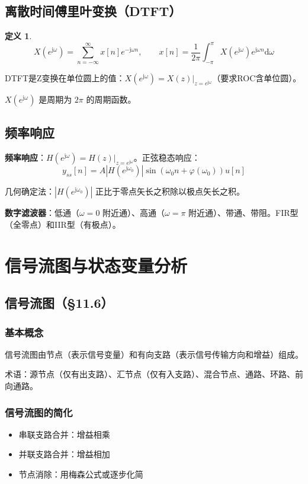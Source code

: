 \documentclass[11pt,a4paper]{ctexart}
\newtheorem{definition}{定义}[section]
\newcommand{\jj}{\mathrm{j}}            %
\newcommand{\dd}{\mathrm{d}}            %
\begin{document}
\subsection{离散时间傅里叶变换（DTFT）}

\begin{definition}
\[
X(e^{\jj\omega}) = \sum_{n=-\infty}^{\infty} x[n]e^{-\jj\omega n},\qquad
x[n] = \frac{1}{2\pi}\int_{-\pi}^{\pi} X(e^{\jj\omega})e^{\jj\omega n}\dd\omega
\]
\end{definition}

DTFT是Z变换在单位圆上的值：$X(e^{\jj\omega}) = X(z)|_{z=e^{\jj\omega}}$（要求ROC含单位圆）。

$X(e^{\jj\omega})$ 是周期为 $2\pi$ 的周期函数。

\subsection{频率响应}

\textbf{频率响应}：$H(e^{\jj\omega}) = H(z)|_{z=e^{\jj\omega}}$。正弦稳态响应：
\[
y_{ss}[n] = A|H(e^{\jj\omega_0})|\sin(\omega_0 n + \varphi(\omega_0))u[n]
\]

几何确定法：$|H(e^{\jj\omega_0})|$ 正比于零点矢长之积除以极点矢长之积。

\textbf{数字滤波器}：低通（$\omega=0$ 附近通）、高通（$\omega=\pi$ 附近通）、带通、带阻。FIR型（全零点）和IIR型（有极点）。

\newpage
\section{信号流图与状态变量分析}

\subsection{信号流图（§11.6）}

\subsubsection{基本概念}
信号流图由节点（表示信号变量）和有向支路（表示信号传输方向和增益）组成。

术语：源节点（仅有出支路）、汇节点（仅有入支路）、混合节点、通路、环路、前向通路。

\subsubsection{信号流图的简化}
\begin{itemize}
    \item 串联支路合并：增益相乘
    \item 并联支路合并：增益相加
    \item 节点消除：用梅森公式或逐步化简
\end{itemize}
\end{document}

